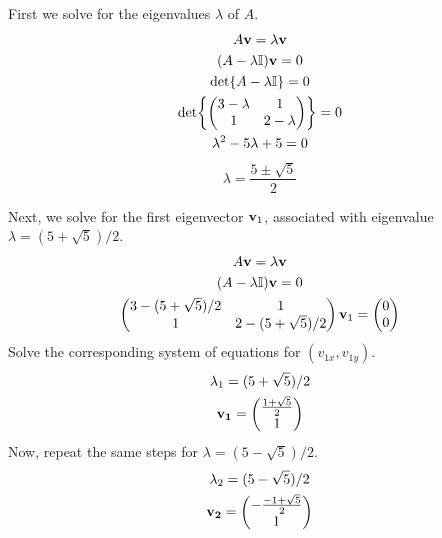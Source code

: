 \documentclass{article}
\begin{document}
    \begin{solution}
        First we solve for the eigenvalues $\lambda$ of $A$.
        \begin{equation*}
            \begin{gathered}
                A\vb{v} = \lambda \vb{v} \\
                (A - \lambda \mathbb{I}) \vb{v} = 0 \\
                \det{A - \lambda \ensuremath{\mathbb{I}}} = 0 \\
                \det{
                    \ensuremath{\begin{pmatrix} 3 - \lambda & 1 \\
                            1 & 2 - \lambda \end{pmatrix}}   
                } = 0 \\
                \lambda^2 - 5\lambda + 5 = 0 \\
            \end{gathered}
        \end{equation*}
        \begin{equation}
            \lambda = \frac{5 \pm \sqrt{5}} {2}
        \end{equation}

        Next, we solve for the first eigenvector $\vb{v}_1$, associated with eigenvalue $\lambda = (5 + \sqrt{5})/2$.
        \begin{gather*}
            A\vb{v} = \lambda \vb{v} \\
            (A - \lambda \mathbb{I}) \vb{v} = 0 \\ 
            \begin{pmatrix} 3 - (5 + \sqrt{5})/2 & 1 \\ 1 & 2 - (5 + \sqrt{5})/2 \end{pmatrix} \vb{v}_1 = \begin{pmatrix} 0 \\ 0 \end{pmatrix}
        \end{gather*}
        Solve the corresponding system of equations for $(v_{1x}, v_{1y})$.
        \begin{equation}
            \begin{gathered}
                \lambda_1 = (5 + \sqrt{5})/2 \\
                \vb{v_1} = \begin{pmatrix} \frac{1 + \sqrt{5}}{2} \\ 1 \end{pmatrix}
            \end{gathered}
        \end{equation}
        Now, repeat the same steps for $\lambda = (5 - \sqrt{5})/2$.
        \begin{equation}
            \begin{gathered}
                \lambda_2 = (5 - \sqrt{5})/2 \\
                \vb{v_2} = \begin{pmatrix} -\frac{-1 + \sqrt{5}}{2} \\ 1 \end{pmatrix}
            \end{gathered}
        \end{equation}
    \end{solution}
\end{document}
